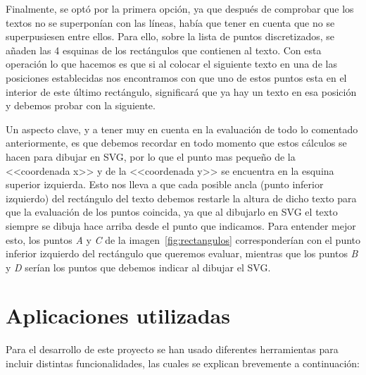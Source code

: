Finalmente, se optó por la primera opción, ya que después de comprobar que los textos no se superponían con las líneas, había que tener en cuenta que no se superpusiesen entre ellos. Para ello, sobre la lista de puntos discretizados, se añaden las 4 esquinas de los rectángulos que contienen al texto. Con esta operación lo que hacemos es que si al colocar el siguiente texto en una de las posiciones establecidas nos encontramos con que uno de estos puntos esta en el interior de este último rectángulo, significará que ya hay un texto en esa posición y debemos probar con la siguiente.

Un aspecto clave, y a tener muy en cuenta en la evaluación de todo lo comentado anteriormente, es que debemos recordar en todo momento que estos cálculos se hacen para dibujar en SVG, por lo que el punto mas pequeño de la <<coordenada x>> y de la <<coordenada y>> se encuentra en la esquina superior izquierda. Esto nos lleva a que cada posible ancla (punto inferior izquierdo) del rectángulo del texto debemos restarle la altura de dicho texto para que la evaluación de los puntos coincida, ya que al dibujarlo en SVG el texto siempre se dibuja hace arriba desde el punto que indicamos. Para entender mejor esto, los puntos \textit{A} y \textit{C} de la imagen~\ref{fig:rectangulos} corresponderían con el punto inferior izquierdo del rectángulo que queremos evaluar, mientras que los puntos \textit{B} y \textit{D} serían los puntos que debemos indicar al dibujar el SVG.


\section{Aplicaciones utilizadas}
Para el desarrollo de este proyecto se han usado diferentes herramientas para incluir distintas funcionalidades, las cuales se explican brevemente a continuación:

